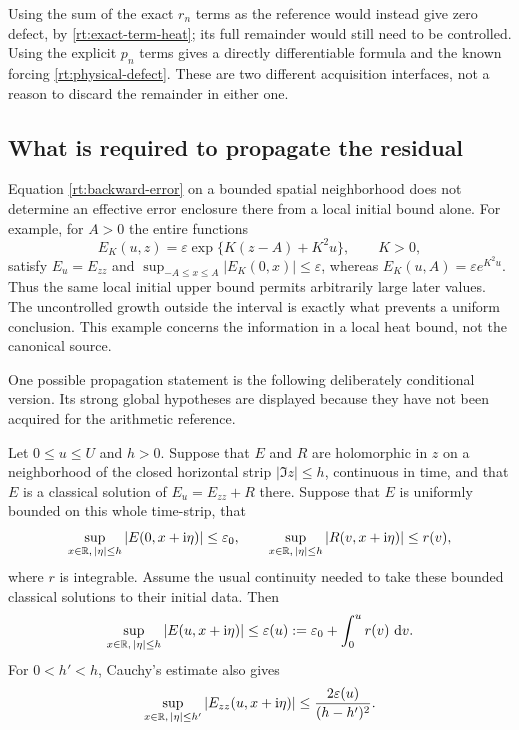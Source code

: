 Using the sum of the exact $r_n$ terms as the reference would instead
give zero defect, by \eqref{rt:exact-term-heat}; its full remainder
would still need to be controlled.  Using the explicit $p_n$ terms
gives a directly differentiable formula and the known forcing
\eqref{rt:physical-defect}.  These are two different acquisition
interfaces, not a reason to discard the remainder in either one.

\subsection{What is required to propagate the residual}

Equation \eqref{rt:backward-error} on a bounded spatial neighborhood
does not determine an effective error enclosure there from a local
initial bound alone.  For example, for $A>0$ the entire functions
\[
 E_K(u,z)=\varepsilon\exp\{K(z-A)+K^2u\},\qquad K>0,
\]
satisfy $E_u=E_{zz}$ and
$\sup_{-A\le x\le A}|E_K(0,x)|\le\varepsilon$, whereas
$E_K(u,A)=\varepsilon e^{K^2u}$.  Thus the same local initial upper
bound permits arbitrarily large later values.  The uncontrolled
growth outside the interval is exactly what prevents a uniform
conclusion.  This example concerns the information in a local heat
bound, not the canonical source.

One possible propagation statement is the following deliberately
conditional version.  Its strong global hypotheses are displayed
because they have not been acquired for the arithmetic reference.

\begin{proposition}
\label{rt:duhamel}
Let $0\le u\le U$ and $h>0$.  Suppose that $E$ and $R$ are
holomorphic in $z$ on a neighborhood of the closed horizontal strip
$|\Im z|\le h$, continuous in time, and that $E$ is a classical
solution of $E_u=E_{zz}+R$ there.  Suppose that $E$ is uniformly
bounded on this whole time-strip, that
\begin{equation}
 \sup_{x\in\mathbb R,\,|\eta|\le h}|E(0,x+\mathrm i\eta)|\le\varepsilon_0,
 \qquad
 \sup_{x\in\mathbb R,\,|\eta|\le h}|R(v,x+\mathrm i\eta)|\le r(v),
 \label{rt:global-data}
\end{equation}
where $r$ is integrable.  Assume the usual continuity needed to take
these bounded classical solutions to their initial data.  Then
\begin{equation}
 \sup_{x\in\mathbb R,\,|\eta|\le h}|E(u,x+\mathrm i\eta)|
       \le\varepsilon(u):=\varepsilon_0+\int_0^u r(v)\,\,\mathrm d v.
 \label{rt:duhamel-bound}
\end{equation}
For $0<h'<h$, Cauchy's estimate also gives
\begin{equation}
 \sup_{x\in\mathbb R,\,|\eta|\le h'}|E_{zz}(u,x+\mathrm i\eta)|
       \le\frac{2\varepsilon(u)}{(h-h')^2}.
 \label{rt:duhamel-jets}
\end{equation}
\end{proposition}

